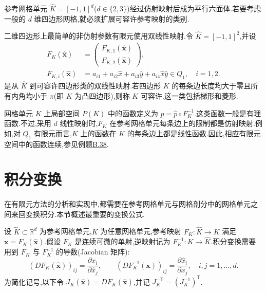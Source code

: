 \begin{note}[参数映射]\label{note:appendix-b-55}
参考网格单元 $\widehat K=[-1,1]^d$($d\in\{2,3\}$)经过仿射映射后成为平行六面体.若要考虑一般的 $d$ 维四边形网格,就必须扩展可容许参考映射的类别.

二维四边形上最简单的非仿射参数有限元使用双线性映射.令
$\widehat K=[-1,1]^2$,并设
\[
\begin{aligned}
 F_K(\widehat{\bm x})&=
 \begin{pmatrix}F_{K,1}(\widehat{\bm x})\\F_{K,2}(\widehat{\bm x})\end{pmatrix},\\
 F_{K,i}(\widehat{\bm x})
 &=a_{i1}+a_{i2}\widehat x+a_{i3}\widehat y
  +a_{i4}\widehat x\widehat y\in Q_1,\quad i=1,2.
\end{aligned}
\]
是从 $\widehat K$ 到可容许四边形类的双线性映射.若四边形 $K$ 的每条边长度均大于零且所有内角均小于 $\pi$(即 $K$ 为凸四边形),则称 $K$ 可容许.这一类包括梯形和菱形.
\end{note}

\begin{note}[参数有限元函数]\label{note:appendix-b-56}
网格单元 $K$ 上局部空间 $P(K)$ 中的函数定义为
$p=\widehat p\circ F_K^{-1}$.这类函数一般是有理函数.不过,采用 $d$ 线性映射时,$F_K$ 在参考网格单元每条边上的限制都是仿射映射.例如,对 $Q_1$ 有限元而言,$K$ 上的函数在 $K$ 的每条边上都是线性函数.因此,相应有限元空间中的函数连续,参见例题\hyperref[ex:appendix-b-38]{B.38}.
\end{note}

\section{积分变换}\label{sec:appendix-b-5}

\begin{note}[动机]\label{note:appendix-b-57}
在有限元方法的分析和实现中,都需要在参考网格单元与网格剖分中的网格单元之间来回变换积分.本节概述最重要的变换公式.

设 $\widehat K\subset\mathbb R^d$ 为参考网格单元,$K$ 为任意网格单元,参考映射 $F_K:\widehat K\to K$ 满足
$\bm x=F_K(\widehat{\bm x})$.假设 $F_K$ 是连续可微的单射,逆映射记为 $F_K^{-1}:K\to\widehat K$.积分变换需要用到 $F_K$ 与 $F_K^{-1}$ 的导数(Jacobian 矩阵):
\[
 (DF_K(\widehat{\bm x}))_{ij}
 =\frac{\partial x_i}{\partial\widehat x_j},\qquad
 (DF_K^{-1}(\bm x))_{ij}
 =\frac{\partial\widehat x_i}{\partial x_j},
 \quad i,j=1,\ldots,d.
\]
为简化记号,以下令
$J_K(\widehat{\bm x})=DF_K(\widehat{\bm x})$,并记
$J_K^{-\mathsf T}=(J_K^{-1})^{\mathsf T}$.
\end{note}

